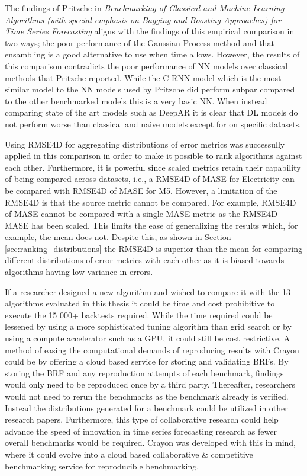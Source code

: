 The findings of Pritzche in \textit{Benchmarking of Classical and Machine-Learning Algorithms (with special emphasis on Bagging and Boosting Approaches) for Time Series Forecasting} aligns with the findings of this empirical comparison in two ways; the poor performance of the Gaussian Process method and that ensambling is a good alternative to use when time allows. However, the results of this comparison contradicts the poor performance of NN models over classical methods that Pritzche reported. While the C-RNN model which is the most similar model to the NN models used by Pritzche did perform subpar compared to the other benchmarked models this is a very basic NN. When instead comparing state of the art models such as DeepAR it is clear that DL models do not perform worse than classical and naive models except for on specific datasets.

Using RMSE4D for aggregating distributions of error metrics was successully applied in this comparison in order to make it possible to rank algorithms against each other. Furthermore, it is powerful since scaled metrics retain their capability of being compared across datasets, i.e., a RMSE4D of MASE for Electricity can be compared with RMSE4D of MASE for M5. However, a limitation of the RMSE4D is that the source metric cannot be compared. For example, RMSE4D of MASE cannot be compared with a single MASE metric as the RMSE4D MASE has been scaled. This limits the ease of generalizing the results which, for example, the mean does not. Despite this, as shown in Section \ref{sec:ranking_distributions} the RMSE4D is superior than the mean for comparing different distributions of error metrics with each other as it is biased towards algorithms having low variance in errors.

If a researcher designed a new algorithm and wished to compare it with the 13 algorithms evaluated in this thesis it could be time and cost prohibitive to execute the 15 000+ backtests required. While the time required could be lessened by using a more sophisticated tuning algorithm than grid search or by using a compute accelerator such as a GPU, it could still be cost restrictive. A method of easing the computational demands of reproducing results with Crayon could be by offering a cloud based service for storing and validating BRFs. By storing the BRF and any reproduction attempts of each benchmark, findings would only need to be reproduced once by a third party. Thereafter, researchers would not need to rerun the benchmarks as the benchmark already is verified. Instead the distributions generated for a benchmark could be utilized in other research papers. Furthermore, this type of collaborative research could help advance the speed of innovation in time series forecasting research as fewer overall benchmarks would be required. Crayon was developed with this in mind, where it could evolve into a cloud based collaborative \& competitive benchmarking service for reproducible benchmarking.